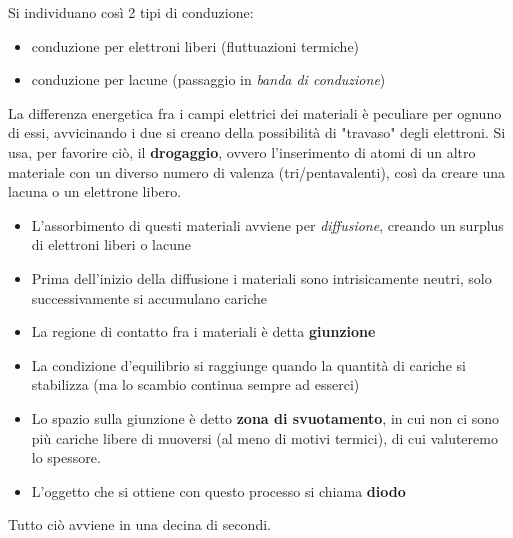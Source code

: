 \documentclass{article}
\begin{document}
Si individuano così 2 tipi di conduzione:
\begin{itemize}
  \item conduzione per elettroni liberi (fluttuazioni termiche)
  \item conduzione per lacune (passaggio in \textit{banda di conduzione})
\end{itemize}
La differenza energetica fra i campi elettrici dei materiali è peculiare per ognuno di essi, avvicinando i due si creano della possibilità di "travaso" degli elettroni.
Si usa, per favorire ciò, il \textbf{drogaggio}, ovvero l'inserimento di atomi di un altro materiale con un diverso numero di valenza (tri/pentavalenti), così da creare una lacuna o un elettrone libero. 
\begin{itemize}
    \item L'assorbimento di questi materiali avviene per \textit{diffusione}, creando un surplus di elettroni liberi o lacune
    \item  Prima dell'inizio della diffusione i materiali sono intrisicamente neutri, solo successivamente si accumulano cariche
    \item  La regione di contatto fra i materiali è detta \textbf{giunzione}
    \item  La condizione d'equilibrio si raggiunge quando la quantità di cariche si stabilizza (ma lo scambio continua sempre ad esserci)
    \item Lo spazio sulla giunzione è detto \textbf{zona di svuotamento}, in cui non ci sono più cariche libere di muoversi (al meno di motivi termici), di cui valuteremo lo spessore.
    \item L'oggetto che si ottiene con questo processo si chiama \textbf{diodo}
\end{itemize}

Tutto ciò avviene in una decina di secondi.
\end{document}
